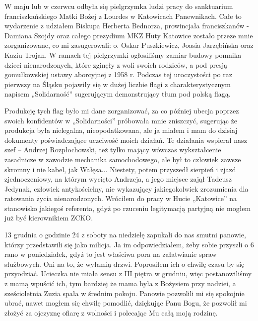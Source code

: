 W maju lub w czerwcu odbyła się pielgrzymka ludzi pracy do sanktuarium franciszkańskiego Matki Bożej z Lourdes w Katowicach Panewnikach. Całe to wydarzenie z udziałem Biskupa Herberta Bednorza, prowincjała franciszkanów - Damiana Szojdy oraz całego prezydium MKZ Huty Katowice zostało przeze mnie zorganizowane, co mi zasugerowali: o. Oskar Puszkiewicz, Joasia Jarzębińska oraz Kaziu Trojan. W ramach tej pielgrzymki ogłosiliśmy zamiar budowy pomnika dzieci nienarodzonych, które zginęły z woli swoich rodziców, a pod presją gomułkowskiej ustawy aborcyjnej z 1958 r. Podczas tej uroczystości po raz pierwszy na Śląsku pojawiły się w dużej liczbie flagi z charakterystycznym napisem „Solidarność” sugerującym demonstrujący tłum pod polską flagą.

Produkcję tych flag było mi dane zorganizować, za co później ubecja poprzez swoich konfidentów w „Solidarności” próbowała mnie zniszczyć, sugerując że produkcja była nielegalna, nieopodatkowana, ale ja miałem i mam do dzisiaj dokumenty poświadczające uczciwość moich działań. Te działania wspierał  nasz szef – Andrzej Rozpłochowski, też tylko mający wówczas wykształcenie zasadnicze w zawodzie mechanika samochodowego, ale był to człowiek zawsze skromny i nie kabel, jak Wałęsa... Niestety, potem przyszedł sierpień i zjazd zjednoczeniowy, na którym wycięto Andrzeja, a jego miejsce zajął Tadeusz Jedynak, człowiek antykościelny, nie wykazujący jakiegokolwiek zrozumienia dla ratowania życia nienarodzonych. Wróciłem do pracy w Hucie „Katowice” na stanowisko jakiegoś referenta, gdyż po rzuceniu legitymacją partyjną nie mogłem już być kierownikiem ZCKO.

13 grudnia o godzinie 24 z soboty na niedzielę zapukali do nas smutni panowie, którzy przedstawili się jako milicja. Ja im odpowiedziałem, żeby sobie przyszli o 6 rano w poniedziałek, gdyż to jest właściwa pora na załatwianie spraw służbowych. Oni na to, że wyłamią drzwi. Poprosiłem ich o chwilę czasu by się przyodziać. Ucieczka nie miała sensu z III piętra w grudniu, więc postanowiliśmy z mamą wpuścić ich, tym bardziej że mama była z Bożysiem przy nadziei, a sześcioletnia Zuzia spała w średnim pokoju. Panowie pozwolili mi się spokojnie ubrać, nawet mogłem się chwilę pomodlić, dziękując Panu Bogu, że pozwolił mi złożyć za ojczyznę ofiarę z wolności i polecając Mu całą moją rodzinę.


